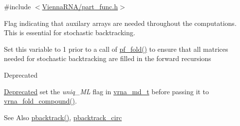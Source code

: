 {\ttfamily \#include $<$\hyperlink{part__func_8h}{Vienna\-R\-N\-A/part\-\_\-func.\-h}$>$}



Flag indicating that auxilary arrays are needed throughout the computations. This is essential for stochastic backtracking. 

Set this variable to 1 prior to a call of \hyperlink{group__pf__fold_gadc3db3d98742427e7001a7fd36ef28c2}{pf\-\_\-fold()} to ensure that all matrices needed for stochastic backtracking are filled in the forward recursions

\begin{DoxyRefDesc}{Deprecated}
\item[\hyperlink{deprecated__deprecated000093}{Deprecated}]set the {\itshape uniq\-\_\-\-M\-L} flag in \hyperlink{group__model__details_ga1f8a10e12a0a1915f2a4eff0b28ea17c}{vrna\-\_\-md\-\_\-t} before passing it to \hyperlink{group__fold__compound_ga6601d994ba32b11511b36f68b08403be}{vrna\-\_\-fold\-\_\-compound()}.\end{DoxyRefDesc}


\begin{DoxySeeAlso}{See Also}
\hyperlink{group__subopt__stochbt_gac03ca6db186bb3bf0a2a326d7fb3ba03}{pbacktrack()}, \hyperlink{group__subopt__stochbt_ga00474051204ac9ad576b3e45174d03ff}{pbacktrack\-\_\-circ} 
\end{DoxySeeAlso}
